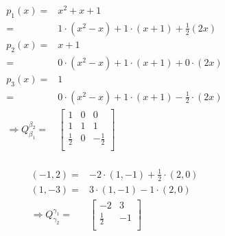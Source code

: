 \documentclass{article}
\begin{document}
\begin{equation*}
\begin{split}
p_1(x)=&x^2+x+1\\
=&1\cdot(x^2-x)+1\cdot(x+1)+\frac{1}{2}(2x)\\
p_2(x)=&x+1\\
=&0\cdot(x^2-x)+1\cdot(x+1)+0\cdot(2x)\\
p_3(x)=&1\\
=&0\cdot(x^2-x)+1\cdot(x+1)-\frac{1}{2}\cdot(2x)\\
\Rightarrow Q^{\beta_2}_{\beta_1}=&\begin{bmatrix}
1&0&0\\
1&1&1\\
\frac{1}{2}&0&-\frac{1}{2}\\
\end{bmatrix}\\
\end{split}
\end{equation*}

\begin{equation*}
\begin{split}
(-1,2)=&-2\cdot(1,-1)+\frac{1}{2}\cdot(2,0)\\
(1,-3)=&3\cdot(1,-1)-1\cdot(2,0)\\
\Rightarrow Q^{\gamma_1}_{\gamma_2}=&\begin{bmatrix}
-2&3\\
\frac{1}{2}&-1\\
\end{bmatrix}\\
\end{split}
\end{equation*}
\end{document}

